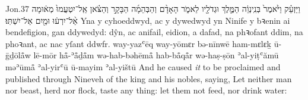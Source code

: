 \begin{example}{Jon.}{3}{7}{}{}
	\quoling
	{וַיַּזְעֵ֗ק וַיֹּ֙אמֶר֙ בְּנִֽינְוֵ֔ה  הַמֶּ֛לֶךְ וּגְדֹלָ֖יו לֵאמֹ֑ר הָאָדָ֨ם וְהַבְּהֵמָ֜ה הַבָּקָ֣ר וְהַצֹּ֗אן אַֽל־יִטְעֲמוּ֙ מְא֔וּמָה אַ֨ל־יִרְע֔וּ וּמַ֖יִם אַל־יִשְׁתּֽוּ׃}
	{Yna y cyhoeddwyd, ac y dywedwyd yn Ninife  y bꝛenin ai bendefigion, gan ddywedyd: dŷn, ac anifail, eidion, a dafad, na phꝛofant ddim, na phoꝛant, ac nac yſant ddwfr.}
	{way-yazʿēq way-yōmɛr bə-nīnwē  ham-mɛlɛḵ ū-ḡḏōlå̄w lē-mōr hå̄-ʾå̄ḏå̄m wə-hab-bəhēmå̄ hab-bå̄qå̄r wə-haṣ-ṣōn ʾal-yiṭʿămū məʾūmå̄ ʾal-yirʿū ū-mayim ʾal-yištū}
	{And he caused \textit{it} to be proclaimed and published through Nineveh  of the king and his nobles, saying, Let neither man nor beast, herd nor flock, taste any thing: let them not feed, nor drink water:}
\end{example}
